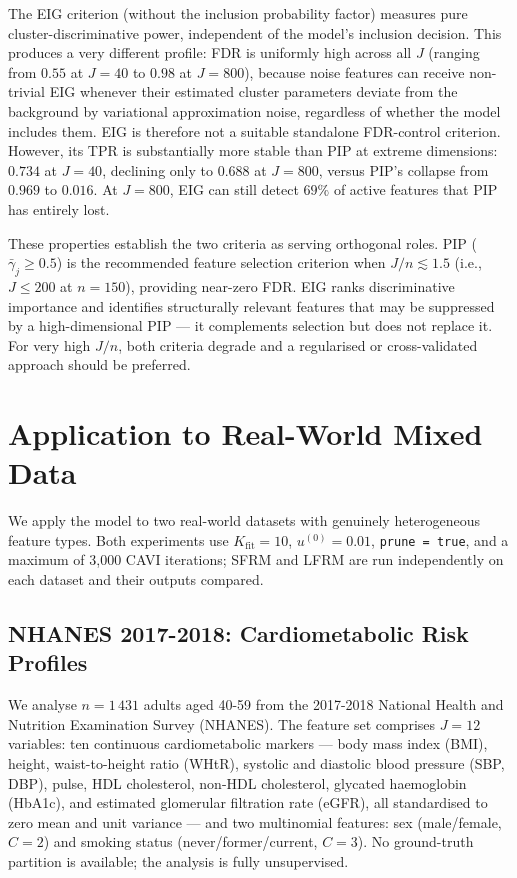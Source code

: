 \documentclass[
  letterpaper,
  DIV=11,
  numbers=noendperiod]{scrartcl}
\begin{document}
The EIG criterion (without the inclusion probability factor) measures
pure cluster-discriminative power, independent of the model's inclusion
decision. This produces a very different profile: FDR is uniformly high
across all \(J\) (ranging from \(0.55\) at \(J = 40\) to \(0.98\) at
\(J = 800\)), because noise features can receive non-trivial EIG
whenever their estimated cluster parameters deviate from the background
by variational approximation noise, regardless of whether the model
includes them. EIG is therefore not a suitable standalone FDR-control
criterion. However, its TPR is substantially more stable than PIP at
extreme dimensions: \(0.734\) at \(J = 40\), declining only to \(0.688\)
at \(J = 800\), versus PIP's collapse from \(0.969\) to \(0.016\). At
\(J = 800\), EIG can still detect \(69\%\) of active features that PIP
has entirely lost.

These properties establish the two criteria as serving orthogonal roles.
PIP (\(\bar{\gamma}_j
\ge 0.5\)) is the recommended feature selection criterion when
\(J/n \lesssim 1.5\) (i.e., \(J \le 200\) at \(n = 150\)), providing
near-zero FDR. EIG ranks discriminative importance and identifies
structurally relevant features that may be suppressed by a
high-dimensional PIP --- it complements selection but does not replace
it. For very high \(J/n\), both criteria degrade and a regularised or
cross-validated approach should be preferred.

\section{Application to Real-World Mixed Data}\label{sec-real-data}

We apply the model to two real-world datasets with genuinely
heterogeneous feature types. Both experiments use
\(K_{\text{fit}} = 10\), \(u^{(0)} = 0.01\), \texttt{prune\ =\ true},
and a maximum of 3,000 CAVI iterations; SFRM and LFRM are run
independently on each dataset and their outputs compared.

\subsection{NHANES 2017-2018: Cardiometabolic Risk
Profiles}\label{sec-nhanes}

We analyse \(n = 1\,431\) adults aged 40-59 from the 2017-2018 National
Health and Nutrition Examination Survey (NHANES). The feature set
comprises \(J = 12\) variables: ten continuous cardiometabolic markers
--- body mass index (BMI), height, waist-to-height ratio (WHtR),
systolic and diastolic blood pressure (SBP, DBP), pulse, HDL
cholesterol, non-HDL cholesterol, glycated haemoglobin (HbA1c), and
estimated glomerular filtration rate (eGFR), all standardised to zero
mean and unit variance --- and two multinomial features: sex
(male/female, \(C = 2\)) and smoking status (never/former/current,
\(C = 3\)). No ground-truth partition is available; the analysis is
fully unsupervised.
\end{document}
